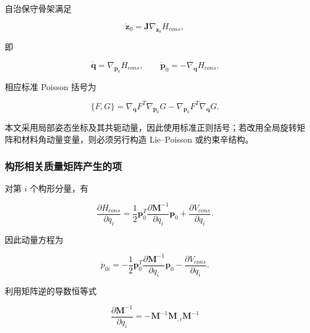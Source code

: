 自治保守骨架满足

\begin{equation}
\label{eq:hamiltonian-3-19}
\boxed{{\dot{\mathbf{z}}}_{0} = \mathbf{J}\nabla_{\mathbf{z}_{0}}H_{cons},}
\end{equation}

即

\begin{equation}
\label{eq:hamiltonian-3-20}
\boxed{\dot{\mathbf{q}} = \nabla_{\mathbf{p}_{0}}H_{cons},\quad\quad{\dot{\mathbf{p}}}_{0} = - \nabla_{\mathbf{q}}H_{cons}.}
\end{equation}

相应标准 Poisson 括号为

\begin{equation}
\label{eq:hamiltonian-3-21}
\{ F,G\} = \nabla_{\mathbf{q}}F^{T}\nabla_{\mathbf{p}_{0}}G - \nabla_{\mathbf{p}_{0}}F^{T}\nabla_{\mathbf{q}}G.
\end{equation}

本文采用局部姿态坐标及其共轭动量，因此使用标准正则括号；若改用全局旋转矩阵和材料角动量变量，则必须另行构造 Lie--Poisson 或约束辛结构。

\subsubsection{构形相关质量矩阵产生的项}\label{sec:hamiltonian-3-3-2}

对第 \(i\) 个构形分量，有

\begin{equation}
\label{eq:hamiltonian-3-22}
\frac{\partial H_{cons}}{\partial q_{i}} = \frac{1}{2}\mathbf{p}_{0}^{T}\frac{\partial\mathbf{M}^{- 1}}{\partial q_{i}}\mathbf{p}_{0} + \frac{\partial V_{cons}}{\partial q_{i}}.
\end{equation}

因此动量方程为

\begin{equation}
\label{eq:hamiltonian-3-23}
\boxed{{\dot{p}}_{0i} = - \frac{1}{2}\mathbf{p}_{0}^{T}\frac{\partial\mathbf{M}^{- 1}}{\partial q_{i}}\mathbf{p}_{0} - \frac{\partial V_{cons}}{\partial q_{i}}.}
\end{equation}

利用矩阵逆的导数恒等式

\begin{equation}
\label{eq:hamiltonian-3-24}
\frac{\partial\mathbf{M}^{- 1}}{\partial q_{i}} = - \mathbf{M}^{- 1}\mathbf{M}_{,i}\mathbf{M}^{- 1}
\end{equation}


